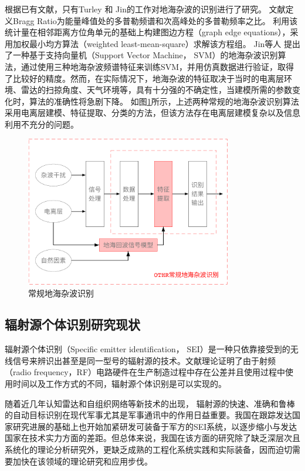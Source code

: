 根据已有文献，只有Turley 和 Jin的工作对地海杂波的识别进行了研究。
文献\cite{turley2013high}定义Bragg Ratio为能量峰值处的多普勒频谱和次高峰处的多普勒频率之比。
利用该统计量在相邻距离方位角单元的基础上构建图边方程（graph edge equations），采用加权最小均方算法（weighted least-mean-square）求解该方程组。
Jin等人 提出了一种基于支持向量机（Support Vector Machine， SVM）的地海杂波识别算法，通过使用三种地海杂波频谱特征来训练SVM，并用仿真数据进行验证，取得了比较好的精度。然而，在实际情况下，地海杂波的特征取决于当时的电离层环境、雷达的扫掠角度、天气环境等，具有十分强的不确定性，当建模所需的参数变化时，算法的准确性将急剧下降。
如图\ref{fig:othr_tradition}所示，上述两种常规的地海杂波识别算法采用电离层建模、特征提取、分类的方法，但该方法存在电离层建模复杂以及信息利用不充分的问题。
\begin{figure}[hbt]
	\centering
	\includegraphics[width=9cm]{figures/introduction/othr_tradition}
	\caption{常规地海杂波识别}
	\label{fig:othr_tradition}
\end{figure}

\subsection{辐射源个体识别研究现状}
辐射源个体识别（Specific emitter identification， SEI）是一种只依靠接受到的无线信号来辨识出甚至是同一型号的辐射源的技术。文献\cite{danev2012physical}理论证明了由于射频（radio frequency，RF）电路硬件在生产制造过程中存在公差并且使用过程中使用时间以及工作方式的不同，辐射源个体识别是可以实现的。

随着近几年认知雷达和自组织网络等新技术的出现，
辐射源的快速、准确和鲁棒的自动目标识别在现代军事尤其是军事通讯中的作用日益重要。我国在跟踪发达国家研究进展的基础上也开始加紧研发可装备于军方的SEI系统，以逐步缩小与发达国家在技术实力方面的差距。但总体来说，我国在该方面的研究除了缺乏深层次且系统化的理论分析研究外，更缺乏成熟的工程化系统实践和实际装备，因而迫切需要加快在该领域的理论研究和应用步伐。

